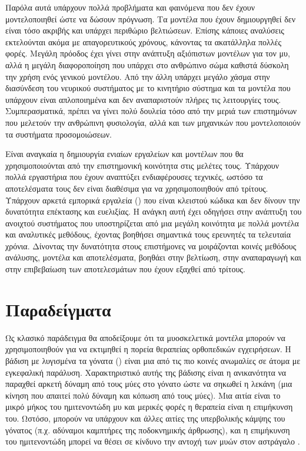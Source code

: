 Παρόλα αυτά υπάρχουν πολλά προβλήματα και φαινόμενα που δεν έχουν μοντελοποιηθεί ώστε να δώσουν πρόγνωση. Τα μοντέλα που έχουν δημιουργηθεί δεν είναι τόσο ακριβής και υπάρχει περιθώριο βελτιώσεων. Επίσης κάποιες αναλύσεις εκτελούνται ακόμα με απαγορευτικούς χρόνους, κάνοντας τα ακατάλληλα πολλές φορές. Μεγάλη πρόοδος έχει γίνει στην ανάπτυξη αξιόπιστων μοντέλων για τον μυ, αλλά η μεγάλη διαφοροποίηση που υπάρχει στο ανθρώπινο σώμα καθιστά δύσκολη την χρήση ενός γενικού μοντέλου. Από την άλλη υπάρχει μεγάλο χάσμα στην διασύνδεση του νευρικού συστήματος με το κινητήριο σύστημα και τα μοντέλα που υπάρχουν είναι απλοποιημένα και δεν αναπαριστούν πλήρες τις λειτουργίες τους. Συμπερασματικά, πρέπει να γίνει πολύ δουλεία τόσο από την μεριά των επιστημόνων που μελετούν την ανθρώπινη φυσιολογία, αλλά και των μηχανικών που μοντελοποιούν τα συστήματα προσομοιώσεων.

Είναι αναγκαία η δημιουργία ενιαίων εργαλείων και μοντέλων που θα χρησιμοποιούνται από την επιστημονική κοινότητα στις μελέτες τους. Υπάρχουν πολλά εργαστήρια που έχουν αναπτύξει ενδιαφέρουσες τεχνικές, ωστόσο τα αποτελέσματα τους δεν είναι διαθέσιμα για να χρησιμοποιηθούν από τρίτους. Υπάρχουν αρκετά εμπορικά εργαλεία () που είναι κλειστού κώδικα και δεν δίνουν την δυνατότητα επέκτασης και ευελιξίας. Η ανάγκη αυτή έχει οδηγήσει στην ανάπτυξη του ανοιχτού συστήματος  που υποστηρίζεται από μια μεγάλη κοινότητα με πολλά μοντέλα και αναλυτικές μεθόδους, έχοντας βοηθήσει σημαντικά τους ερευνητές τα τελευταία χρόνια. Δίνοντας την δυνατότητα στους επιστήμονες να μοιράζονται κοινές μεθόδους ανάλυσης, μοντέλα και αποτελέσματα, βοηθάει στην βελτίωση, στην αναπαραγωγή και στην επιβεβαίωση των αποτελεσμάτων που έχουν εξαχθεί από τρίτους.

\section*{Παραδείγματα}

Ως κλασικό παράδειγμα θα αποδείξουμε ότι τα μυοσκελετικά μοντέλα μπορούν να χρησιμοποιηθούν για να εκτιμηθεί η πορεία θεραπείας ορθοπεδικών εγχειρήσεων. Η βάδιση με λυγισμένα τα γόνατα () είναι μια από τις πιο κοινές ανωμαλίες σε άτομα με εγκεφαλική παράλυση. Χαρακτηριστικό αυτής της βάδισης είναι η ανικανότητα να παραχθεί αρκετή δύναμη από τους μύες στο γόνατο ώστε να σηκωθεί η λεκάνη (μια κίνηση που απαιτεί πολύ δύναμη και κόπωση από τους μύες).  Μια αιτία είναι το μικρό μήκος του ημιτενοντώδη μυ και μερικές φορές η θεραπεία είναι η επιμήκυνση του. Ωστόσο, μπορούν να υπάρχουν και άλλες αιτίες της υπερβολικής κάμψης του γόνατος (π.χ. αδύναμοι καμπτήρες της ποδοκνημικής άρθρωσης), και η επιμήκυνση του ημιτενοντώδη μπορεί να θέσει σε κίνδυνο την αντοχή των μυών στον αστράγαλο \cite{arnolda06}.

